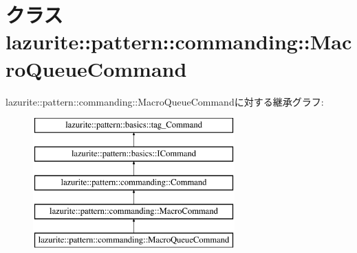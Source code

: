 \hypertarget{classlazurite_1_1pattern_1_1commanding_1_1_macro_queue_command}{
\section{クラス lazurite::pattern::commanding::MacroQueueCommand}
\label{classlazurite_1_1pattern_1_1commanding_1_1_macro_queue_command}
}
lazurite::pattern::commanding::MacroQueueCommandに対する継承グラフ:\begin{figure}[H]
\begin{center}
\leavevmode
\includegraphics[height=5cm]{classlazurite_1_1pattern_1_1commanding_1_1_macro_queue_command}
\end{center}
\end{figure}
